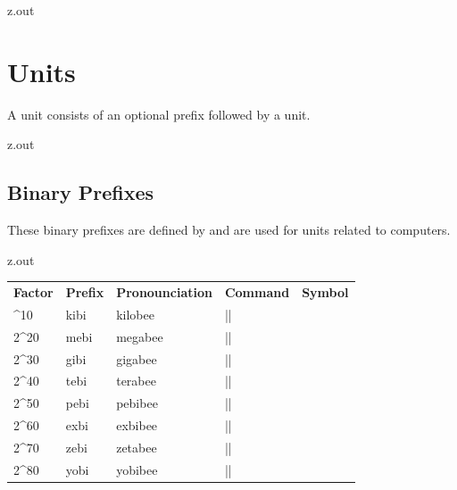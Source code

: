 \MyIO


\begin{VerbatimOut}{z.out}

\section{Units}

A unit consists of an optional prefix
followed by a unit.
\end{VerbatimOut}

\MyIO


\begin{VerbatimOut}{z.out}

\subsection{Binary Prefixes}
\end{VerbatimOut}

These binary prefixes are defined by 
and are used for units related to computers.
\MyIO

  
\begin{VerbatimOut}{z.out}
{
  \noindent
  \hspace*{2\parindent}\begin{tabular}{@{}mllll@{}}
    \textbf{Factor}& \textbf{Prefix}& \textbf{Pronounciation}& \textbf{Command}& \textbf{Symbol}\\
    \tabularspace
    2^{10}& kibi& kilobee& |\kibi|& \unit{\kibi\nounit}\\
    2^{20}& mebi& megabee& |\mebi|& \unit{\mebi\nounit}\\
    2^{30}& gibi& gigabee& |\gibi|& \unit{\gibi\nounit}\\
    2^{40}& tebi& terabee& |\tebi|& \unit{\tebi\nounit}\\
    2^{50}& pebi& pebibee& |\pebi|& \unit{\pebi\nounit}\\
    2^{60}& exbi& exbibee& |\exbi|& \unit{\exbi\nounit}\\
    2^{70}& zebi& zetabee& |\zebi|& \unit{\zebi\nounit}\\
    2^{80}& yobi& yobibee& |\yobi|& \unit{\yobi\nounit}\\
  \end{tabular}
}
\end{VerbatimOut}

\MyIO


